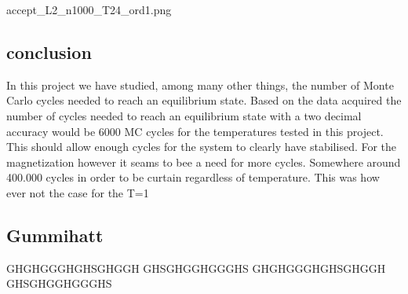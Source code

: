 \documentclass{article}
\begin{document}
accept_L2_n1000_T24_ord1.png

\subsection{conclusion}
In this project we have studied, among many other things, the number of Monte Carlo cycles needed to reach an equilibrium state. Based on the data acquired the number of cycles needed to reach an equilibrium state with a two decimal accuracy would be 6000 MC cycles for the temperatures tested in this project. This should allow enough cycles for the system to clearly have stabilised. For the magnetization however it seams to bee a need for more cycles. Somewhere around 400.000 cycles in order to be curtain regardless of temperature. This was how ever not the case for the T=1



\subsection{Gummihatt}

\newline
GHGHGGGHGHSGHGGH
\newline
GHSGHGGHGGGHS
\newline
\newline
GHGHGGGHGHSGHGGH
\newline
GHSGHGGHGGGHS
\end{document}
